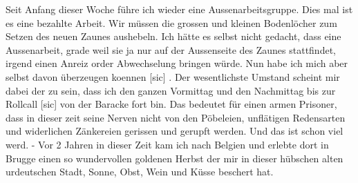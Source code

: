 \def\day{11.9.42 *}
\mktitle

Seit Anfang dieser Woche f\"{u}hre ich wieder eine Aussenarbeitsgruppe.
Dies mal ist es eine bezahlte Arbeit.
Wir m\"{u}ssen die grossen und kleinen Bodenl\"{o}cher zum Setzen des neuen Zaunes aushebeln.
Ich h\"{a}tte es selbst nicht gedacht, dass eine Aussenarbeit, grade weil sie ja nur auf der Aussenseite des Zaunes stattfindet, irgend einen Anreiz order Abwechselung bringen w\"{u}rde.
Nun habe ich mich aber selbst davon \"{u}berzeugen koennen{\color{red} [sic] }.
Der wesentlichste Umstand scheint mir dabei der zu sein, dass ich den ganzen Vormittag und den Nachmittag bis zur Rollcall{\color{red} [sic] } von der Baracke fort bin.
Das bedeutet f\"{u}r einen armen Prisoner, dass in dieser zeit seine Nerven nicht von den P\"{o}beleien, unfl\"{a}tigen Redensarten und widerlichen Z\"{a}nkereien gerissen und gerupft werden.
Und das ist schon viel werd. - Vor 2 Jahren in dieser Zeit kam ich nach Belgien und erlebte dort in Brugge einen so wundervollen goldenen Herbst der mir in dieser h\"{u}bschen alten urdeutschen Stadt, Sonne, Obst, Wein und K\"{u}sse beschert hat.

\clearpage
